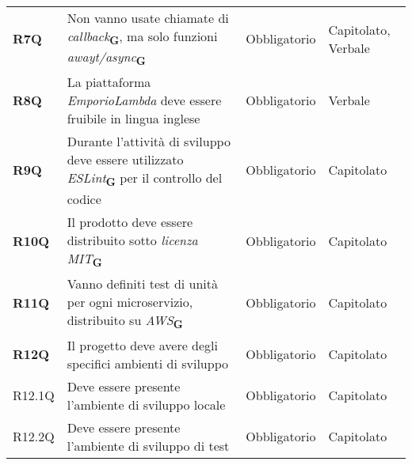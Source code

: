\begin{center}
\begin{longtable}[!h]{p{50px} p{200px} p{100px} p{50px}}
        \textbf{R7Q}                          & Non vanno usate chiamate di \textit{callback}\textsubscript{\textbf{G}}, \newline ma solo funzioni \textit{awayt/async}\textsubscript{\textbf{G}}                               & Obbligatorio             & Capitolato, \newline Verbale \\
        \textbf{R8Q}                          & La piattaforma \textit{EmporioLambda} deve essere fruibile in lingua inglese                                                                                                    & Obbligatorio             & Verbale                      \\
        \textbf{R9Q}                          & Durante l'attività di sviluppo deve essere utilizzato \textit{ESLint}\textsubscript{\textbf{G}} per il controllo del codice                                                     & Obbligatorio             & Capitolato                   \\
        \textbf{R10Q}                         & Il prodotto deve essere distribuito sotto \textit{licenza MIT}\textsubscript{\textbf{G}}                                                                                        & Obbligatorio             & Capitolato                   \\
        \textbf{R11Q}                         & Vanno definiti test di unità per ogni microservizio, distribuito su \textit{AWS}\textsubscript{\textbf{G}}                                                                      & Obbligatorio             & Capitolato                   \\
        \textbf{R12Q}                         & Il progetto deve avere degli specifici ambienti di sviluppo                                                                                                                     & Obbligatorio             & Capitolato                   \\
        R12.1Q                                & Deve essere presente l'ambiente di sviluppo locale                                                                                                                              & Obbligatorio             & Capitolato                   \\
        R12.2Q                                & Deve essere presente l'ambiente di sviluppo di test                                                                                                                             & Obbligatorio             & Capitolato                   \\

\end{longtable}
\end{center}
